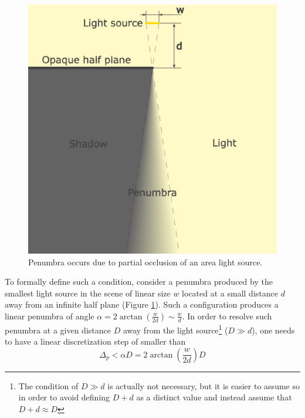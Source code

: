 \documentclass{jcgt}
\begin{document}
\begin{figure}[htb]
  \centering
  \includegraphics[width=0.5\columnwidth]{images/penumbra.png}
  \caption{\label{fig:penumbra} Penumbra occurs due to partial occlusion of an area light source.}
\end{figure}

To formally define such a condition, consider a penumbra produced by the smallest light source in the scene of linear size $w$ located at a small distance $d$ away from an infinite half plane (Figure \ref {fig:penumbra}).
Such a configuration produces a linear penumbra of angle
$
  \alpha = 2\arctan\left(\frac{ w}{2d}\right) \sim \frac{w}{d}
  \label{eq:pen_ang}
$. In order to resolve such penumbra at a given distance $D$ away from the light source\footnote{The condition of $D \gg d$ is actually not necessary, but it is easier to assume so in order to avoid defining $D + d$ as a distinct value and instead assume that $D+d \approx D$} ($D \gg d$),
one needs to have a linear discretization step of smaller than 
\begin{equation}
\Delta_p < \alpha D = 2\arctan\left(\frac{ w}{2d}\right) D
\label{eq:delta_p_big}
\end{equation}
\end{document}

